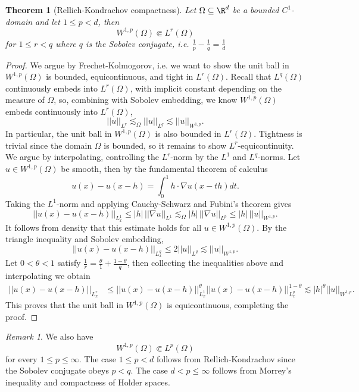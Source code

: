\documentclass[reqno]{amsart}
\newtheorem{theorem}{Theorem}
\theoremstyle{definition}
\theoremstyle{remark}
\newtheorem*{remark}{Remark}
\begin{document}
\begin{theorem}[Rellich-Kondrachov compactness]
	Let $\Omega \subseteq \R^d$ be a bounded $C^1$-domain and let $1 \leq p < d$, then 
		\[ W^{1, p} (\Omega) \Subset L^r (\Omega) \]
	for $1 \leq r < q$ where $q$ is the Sobolev conjugate, i.e. $\tfrac1p - \tfrac1q = \tfrac1d$
\end{theorem}

\begin{proof}
	We argue by Frechet-Kolmogorov, i.e. we want to show the unit ball in $W^{1, p} (\Omega)$ is bounded, equicontinuous, and tight in $L^r (\Omega)$. Recall that $L^q (\Omega)$ continuously embeds into $L^r (\Omega)$, with implicit constant depending on the measure of $\Omega$, so, combining with Sobolev embedding, we know $W^{1, p} (\Omega)$ embeds continuously into $L^r (\Omega)$,
		\[ ||u||_{L^r} \lesssim_\Omega ||u||_{L^q} \lesssim ||u||_{W^{1, p}}. \]
	In particular, the unit ball in $W^{1, p} (\Omega)$ is also bounded in $L^r (\Omega)$. Tightness is trivial since the domain $\Omega$ is bounded, so it remains to show $L^r$-equicontinuity. We argue by interpolating, controlling the $L^r$-norm by the $L^1$ and $L^q$-norms. Let $u \in W^{1, p} (\Omega)$ be smooth, then by the fundamental theorem of calculus 
		\[ u(x) - u(x - h) = \int_0^1 h \cdot \nabla u(x - th) dt. \]
	Taking the $L^1$-norm and applying Cauchy-Schwarz and Fubini's theorem gives	
		\[ ||u(x) - u(x - h)||_{L^1_x}  \leq |h| \, ||\nabla u||_{L^1} \lesssim_\Omega |h| \, ||\nabla u||_{L^p} \leq |h| \, ||u||_{W^{1, p}}. \]
	It follows from density that this estimate holds for all $u \in W^{1, p} (\Omega)$. By the triangle inequality and Sobolev embedding, 
		\[ ||u(x) - u(x - h)||_{L^q_x} \leq 2 ||u||_{L^q} \lesssim ||u||_{W^{1, p}}.\]	
	Let $0 < \theta < 1$ satisfy $\tfrac1r = \tfrac\theta1 + \tfrac{1 - \theta}{q}$, then collecting the inequalities above and interpolating we obtain
		\begin{align*}
			 ||u(x) - u(x - h)||_{L^r_x}
			 	&\leq ||u(x) - u(x - h)||_{L^1_x}^\theta ||u(x) - u(x - h)||_{L^q_x}^{1 - \theta} \lesssim |h|^\theta ||u||_{W^{1, p}}. 
		\end{align*}	 
	This proves that the unit ball in $W^{1, p} (\Omega)$ is equicontinuous, completing the proof.
\end{proof}

\begin{remark}
	We also have
		\[ W^{1, p} (\Omega) \Subset L^p (\Omega) \]
	for every $1 \leq p \leq \infty$. The case $1 \leq p < d$ follows from Rellich-Kondrachov since the Sobolev conjugate obeys $p < q$. The case $d < p \leq \infty$ follows from Morrey's inequality and compactness of Holder spaces. 	
\end{remark}
\end{document}
